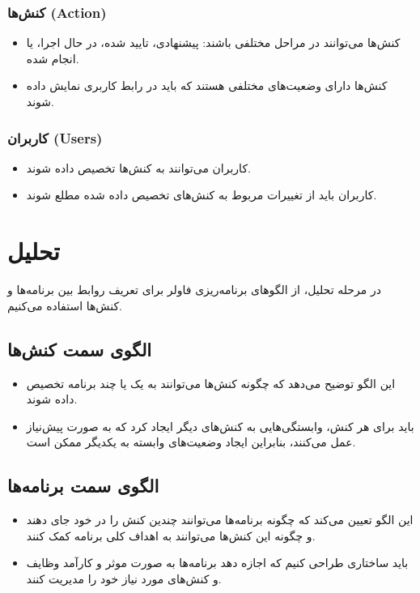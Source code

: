 \subsubsection*{کنش‌ها (Action)}

\begin{itemize}
	\item کنش‌ها می‌توانند در مراحل مختلفی باشند: پیشنهادی، تایید شده، در حال اجرا، یا انجام شده.
	\item کنش‌ها دارای وضعیت‌های مختلفی هستند که باید در رابط کاربری نمایش داده شوند.
\end{itemize}

\subsubsection*{کاربران (Users)}

\begin{itemize}
	\item کاربران می‌توانند به کنش‌ها تخصیص داده شوند.
	\item کاربران باید از تغییرات مربوط به کنش‌های تخصیص داده شده مطلع شوند.
\end{itemize}

\section*{تحلیل}

در مرحله تحلیل، از الگوهای برنامه‌ریزی فاولر برای تعریف روابط بین برنامه‌ها و کنش‌ها استفاده می‌کنیم.

\subsection*{الگوی سمت کنش‌ها}

\begin{itemize}
	\item این الگو توضیح می‌دهد که چگونه کنش‌ها می‌توانند به یک یا چند برنامه تخصیص داده شوند.
	\item باید برای هر کنش، وابستگی‌هایی به کنش‌های دیگر ایجاد کرد که به صورت پیش‌نیاز عمل می‌کنند، بنابراین ایجاد وضعیت‌های وابسته به یکدیگر ممکن است.
\end{itemize}

\subsection*{الگوی سمت برنامه‌ها}

\begin{itemize}
	\item این الگو تعیین می‌کند که چگونه برنامه‌ها می‌توانند چندین کنش را در خود جای دهند و چگونه این کنش‌ها می‌توانند به اهداف کلی برنامه کمک کنند.
	\item باید ساختاری طراحی کنیم که اجازه دهد برنامه‌ها به صورت موثر و کارآمد وظایف و کنش‌های مورد نیاز خود را مدیریت کنند.
\end{itemize}

